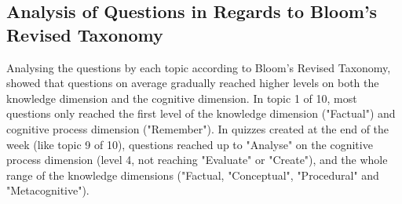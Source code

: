 \subsection{Analysis of Questions in Regards to Bloom's Revised Taxonomy}



Analysing the questions by each topic according to Bloom's Revised Taxonomy, showed that questions on average gradually reached higher levels on both the knowledge dimension and the cognitive dimension. In topic 1 of 10, most questions only reached the first level of the knowledge dimension ("Factual") and cognitive process dimension ("Remember"). In quizzes created at the end of the week (like topic 9 of 10), questions reached up to "Analyse" on the cognitive process dimension (level 4, not reaching "Evaluate" or "Create"), and the whole range of the knowledge dimensions ("Factual, "Conceptual", "Procedural" and "Metacognitive").
